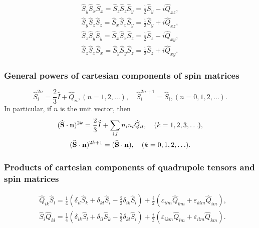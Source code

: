 \begin{equation}
\begin{gathered}
\hat{S}_{y} \hat{S}_{x} \hat{S}_{x}=\hat{S}_{z} \hat{S}_{z} \hat{S}_{y}=\frac{1}{2} \hat{S}_{y}-i \hat{Q}_{x z} ,\\
\hat{S}_{y} \hat{S}_{z} \hat{S}_{z}=\hat{S}_{x} \hat{S}_{x} \hat{S}_{y}=\frac{1}{2} \hat{S}_{y}+i \hat{Q}_{x z} , 
\end{gathered}\label{eq:2:6:48}
\end{equation}
\begin{equation}
\begin{gathered}
\hat{S}_{z} \hat{S}_{y} \hat{S}_{y}=\hat{S}_{x} \hat{S}_{x} \hat{S}_{z}=\frac{1}{2} \hat{S}_{z}-i \hat{Q}_{x y} , \\
\hat{S}_{z} \hat{S}_{x} \hat{S}_{x}=\hat{S}_{y} \hat{S}_{y} \hat{S}_{z}=\frac{1}{2} \hat{S}_{z}+i \hat{Q}_{x y}. 
\end{gathered}\label{eq:2:6:49}
\end{equation} 
\subsubsection{General powers of  cartesian components of spin matrices}
\begin{equation}
\widehat{S}_{i}^{2 n}=\frac{2}{3} \widehat{I}+\widehat{Q}_{i i},(n=1,2, \ldots), \quad \widehat{S}_{i}^{2 n+1}=\widehat{S}_{i},(n=0,1,2, \ldots). \label{eq:2:6:50}
\end{equation}
In particular, if $n$ is the unit vector, then
\begin{gather}
(\widehat{\mathbf{S}} \cdot \mathbf{n})^{2 k}=\frac{2}{3} \widehat{I}+\sum_{i, l} n_{i} n_{l} \widehat{Q}_{i l}, \quad(k=1,2,3, \ldots) , \label{eq:2:6:51}\\
(\widehat{\mathbf{S}} \cdot \mathbf{n})^{2 k+1}=(\widehat{\mathbf{S}} \cdot \mathbf{n}), \quad(k=0,1,2, \ldots) .\notag
\end{gather}
\subsubsection{Products of  cartesian components of quadrupole tensors and spin matrices}
\begin{align}
& \widehat{Q}_{i k} \widehat{S}_{l}=\frac{1}{4}\left(\delta_{i l} \widehat{S}_{k}+\delta_{k l} \widehat{S}_{i}-\frac{2}{3} \delta_{i k} \widehat{S}_{l}\right)+\frac{i}{2}\left(\varepsilon_{i l m} \widehat{Q}_{k m}+\varepsilon_{k l m} \widehat{Q}_{i m}\right) , \label{eq:2:6:52}\\
& \widehat{S}_{i} \widehat{Q}_{k l}=\frac{1}{4}\left(\delta_{i k} \widehat{S}_{l}+\delta_{i l} \widehat{S}_{k}-\frac{2}{3} \delta_{k l} \widehat{S}_{i}\right)+\frac{i}{2}\left(\varepsilon_{i k m} \widehat{Q}_{l m}+\varepsilon_{i l m} \widehat{Q}_{k m}\right) .\label{eq:2:6:53}
\end{align}
